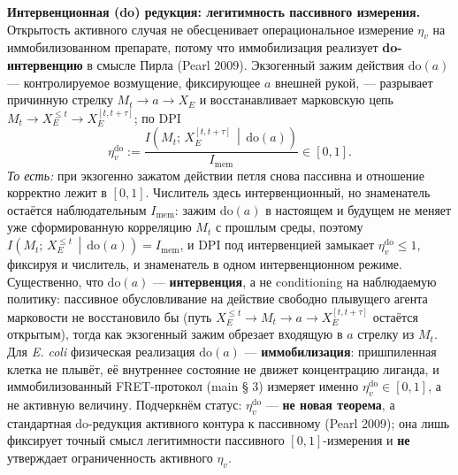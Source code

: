 \documentclass[pdflatex,sn-mathphys-ay]{sn-jnl}
\begin{document}
\textbf{Интервенционная (do) редукция: легитимность пассивного измерения.} Открытость активного случая не обесценивает операциональное измерение \(\eta_v\) на иммобилизованном препарате, потому что иммобилизация реализует \textbf{do-интервенцию} в смысле Пирла (Pearl 2009). Экзогенный зажим действия \(\mathrm{do}(a)\) --- контролируемое возмущение, фиксирующее \(a\) внешней рукой, --- разрывает причинную стрелку \(M_t \to a \to X_E\) и восстанавливает марковскую цепь \(M_t \to X_E^{\le t} \to X_E^{[t, t+\tau]}\); по DPI \[\eta_v^{\mathrm{do}} := \frac{I\!\left(M_t;\, X_E^{[t, t+\tau]} \,\middle|\, \mathrm{do}(a)\right)}{I_{\text{mem}}} \in [0, 1].\] \emph{То есть:} при экзогенно зажатом действии петля снова пассивна и отношение корректно лежит в \([0, 1]\). Числитель здесь интервенционный, но знаменатель остаётся наблюдательным \(I_{\text{mem}}\): зажим \(\mathrm{do}(a)\) в настоящем и будущем не меняет уже сформированную корреляцию \(M_t\) с прошлым среды, поэтому \(I\!\left(M_t;\, X_E^{\le t}\,\middle|\,\mathrm{do}(a)\right) = I_{\text{mem}}\), и DPI под интервенцией замыкает \(\eta_v^{\mathrm{do}} \le 1\), фиксируя и числитель, и знаменатель в одном интервенционном режиме. Существенно, что \(\mathrm{do}(a)\) --- \textbf{интервенция}, а не conditioning на наблюдаемую политику: пассивное обусловливание на действие свободно плывущего агента марковости не восстановило бы (путь \(X_E^{\le t} \to M_t \to a \to X_E^{[t, t+\tau]}\) остаётся открытым), тогда как экзогенный зажим обрезает входящую в \(a\) стрелку из \(M_t\). Для \emph{E. coli} физическая реализация \(\mathrm{do}(a)\) --- \textbf{иммобилизация}: пришпиленная клетка не плывёт, её внутреннее состояние не движет концентрацию лиганда, и иммобилизованный FRET-протокол (main § 3) измеряет именно \(\eta_v^{\mathrm{do}} \in [0, 1]\), а не активную величину. Подчеркнём статус: \(\eta_v^{\mathrm{do}}\) --- \textbf{не новая теорема}, а стандартная do-редукция активного контура к пассивному (Pearl 2009); она лишь фиксирует точный смысл легитимности пассивного \([0, 1]\)-измерения и \textbf{не} утверждает ограниченность активного \(\eta_v\).
\end{document}
